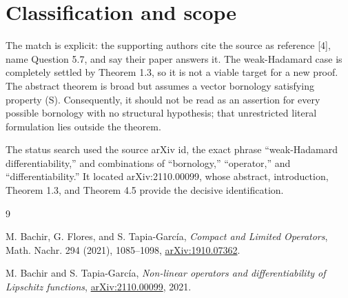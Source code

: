 \documentclass[10pt]{article}
\begin{document}
\section*{Classification and scope}

The match is explicit: the supporting authors cite the source as reference
[4], name Question 5.7, and say their paper answers it. The weak-Hadamard case
is completely settled by Theorem 1.3, so it is not a viable target for a new
proof. The abstract theorem is broad but assumes a vector bornology satisfying
property (S). Consequently, it should not be read as an assertion for every
possible bornology with no structural hypothesis; that unrestricted literal
formulation lies outside the theorem.

The status search used the source arXiv id, the exact phrase
``weak-Hadamard differentiability,'' and combinations of ``bornology,''
``operator,'' and ``differentiability.'' It located arXiv:2110.00099, whose
abstract, introduction, Theorem 1.3, and Theorem 4.5 provide the decisive
identification.

\begin{thebibliography}{9}

M. Bachir, G. Flores, and S. Tapia-Garc\'ia,
\emph{Compact and Limited Operators},
Math. Nachr. 294 (2021), 1085--1098,
\href{https://arxiv.org/abs/1910.07362}{arXiv:1910.07362}.

M. Bachir and S. Tapia-Garc\'ia,
\emph{Non-linear operators and differentiability of Lipschitz functions},
\href{https://arxiv.org/abs/2110.00099}{arXiv:2110.00099}, 2021.

\end{thebibliography}
\end{document}
